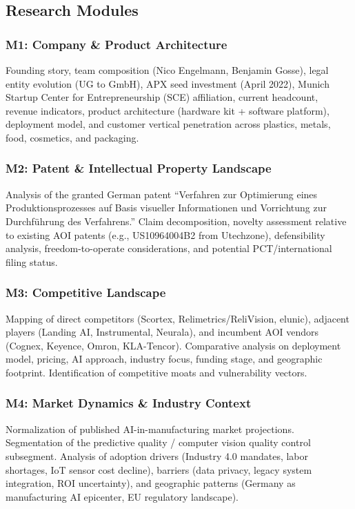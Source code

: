 \documentclass[11pt,letterpaper]{article}
\begin{document}
\subsection{Research Modules}

\subsubsection{M1: Company \& Product Architecture}

Founding story, team composition (Nico Engelmann, Benjamin Gosse), legal entity evolution (UG to GmbH), APX seed investment (April 2022), Munich Startup Center for Entrepreneurship (SCE) affiliation, current headcount, revenue indicators, product architecture (hardware kit + software platform), deployment model, and customer vertical penetration across plastics, metals, food, cosmetics, and packaging.

\subsubsection{M2: Patent \& Intellectual Property Landscape}

Analysis of the granted German patent ``Verfahren zur Optimierung eines Produktionsprozesses auf Basis visueller Informationen und Vorrichtung zur Durchführung des Verfahrens.'' Claim decomposition, novelty assessment relative to existing AOI patents (e.g., US10964004B2 from Utechzone), defensibility analysis, freedom-to-operate considerations, and potential PCT/international filing status.

\subsubsection{M3: Competitive Landscape}

Mapping of direct competitors (Scortex, Relimetrics/ReliVision, elunic), adjacent players (Landing AI, Instrumental, Neurala), and incumbent AOI vendors (Cognex, Keyence, Omron, KLA-Tencor). Comparative analysis on deployment model, pricing, AI approach, industry focus, funding stage, and geographic footprint. Identification of competitive moats and vulnerability vectors.

\subsubsection{M4: Market Dynamics \& Industry Context}

Normalization of published AI-in-manufacturing market projections. Segmentation of the predictive quality / computer vision quality control subsegment. Analysis of adoption drivers (Industry 4.0 mandates, labor shortages, IoT sensor cost decline), barriers (data privacy, legacy system integration, ROI uncertainty), and geographic patterns (Germany as manufacturing AI epicenter, EU regulatory landscape).
\end{document}
